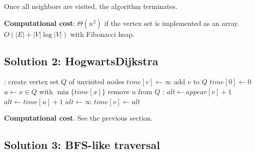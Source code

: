 \documentclass{article}
\begin{document}
Once all neighbors are visited, the algorithm terminates.

\begin{framed}
  \noindent
  \textbf{Computational cost}: $\Theta(n^{2})$ if the vertex set is implemented as an array. $O(|E|+|V|\log |V|)$ with Fibonacci heap.
\end{framed}

\subsection{Solution 2: HogwartsDijkstra}

\begin{algorithmic}[1]
  :
  \State create vertex set $Q$ of unvisited nodes
        
      \State $time[v] \gets \infty$  
      \State add $v$ to $Q$          
  \EndFor
  \State $time[0] \gets 0$ 
      \State $u \gets x \in Q$ with $\min\{time[x]\}$
      \State remove $u$ from $Q$
      :
              \State $alt \gets appear[v] + 1$ 
              \State $alt \gets time[u] + 1$       
          \Else                        
              \State $alt \gets \infty$            
          \EndIf
              \State $time[v] \gets alt$           
          \EndIf
      \EndFor
  \EndWhile
  \State {}
  \EndFunction
\end{algorithmic}

\begin{framed}
  \noindent
  \textbf{Computational cost}. See the previous section.
\end{framed}

\subsection{Solution 3: BFS-like traversal}
\end{document}
